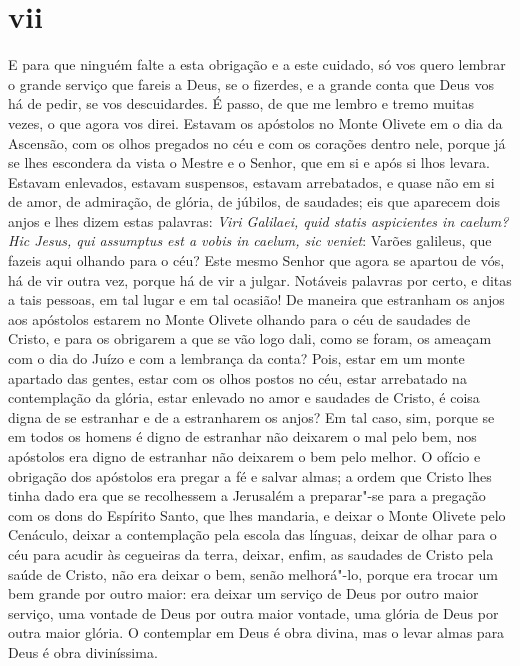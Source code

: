 \section{vii}

E para que ninguém falte a esta obrigação e a este cuidado, só vos quero
lembrar o grande serviço que fareis a Deus, se o fizerdes, e a grande
conta que Deus vos há de pedir, se vos descuidardes. É passo, de que me
lembro e tremo muitas vezes, o que agora vos direi. Estavam os apóstolos
no Monte Olivete em o dia da Ascensão, com os olhos pregados no céu e
com os corações dentro nele, porque já se lhes escondera da vista o
Mestre e o Senhor, que em si e após
si lhos levara. Estavam enlevados, estavam suspensos, estavam
arrebatados, e quase não em si de amor, de admiração, de glória, de
júbilos, de saudades; eis que aparecem dois anjos e lhes dizem estas
palavras: \emph{Viri Galilaei, quid statis aspicientes in caelum? Hic
Jesus, qui assumptus est a vobis in caelum, sic veniet}: Varões
galileus, que fazeis aqui olhando para o céu? Este mesmo Senhor que
agora se apartou de vós, há de vir outra vez, porque há de vir a julgar.
Notáveis palavras por certo, e ditas a tais pessoas, em tal lugar e
em tal ocasião! De maneira que estranham os anjos aos apóstolos estarem
no Monte Olivete olhando para o céu de saudades de Cristo, e para os
obrigarem a que se vão logo dali, como se foram, os ameaçam com o
dia do Juízo e com a lembrança da conta? Pois, estar em um monte
apartado das gentes, estar com os olhos postos no céu, estar arrebatado
na contemplação da glória, estar enlevado no amor e saudades de Cristo,
é coisa digna de se estranhar e de a estranharem os anjos? Em tal caso,
sim, porque se em todos os homens é digno de estranhar não deixarem o
mal pelo bem, nos apóstolos era digno de estranhar não deixarem o bem
pelo melhor. O ofício e obrigação dos apóstolos era pregar a fé e salvar
almas; a ordem que Cristo lhes tinha dado era que se recolhessem a
Jerusalém a preparar"-se para a pregação com os dons do Espírito Santo,
que lhes mandaria, e deixar o Monte Olivete pelo Cenáculo, deixar a
contemplação pela escola das línguas, deixar de olhar para o céu para
acudir às cegueiras da terra, deixar, enfim, as saudades de Cristo pela
saúde de Cristo, não era deixar o bem, senão melhorá"-lo, porque era
trocar um bem grande por outro maior: era deixar um serviço de Deus por
outro maior serviço, uma vontade de Deus por outra maior vontade, uma
glória de Deus por outra maior glória. O contemplar em Deus é obra
divina, mas o levar almas para Deus é obra diviníssima.
